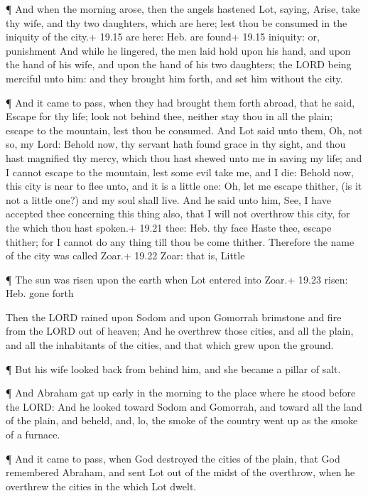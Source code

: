  ¶ And when the morning arose, then the angels hastened
Lot, saying, Arise, take thy wife, and thy two daughters, which are
here; lest thou be consumed in the iniquity of the city.+ 19.15 are
here: Heb. are found+ 19.15 iniquity: or, punishment  And
while he lingered, the men laid hold upon his hand, and upon the hand of
his wife, and upon the hand of his two daughters; the LORD being
merciful unto him: and they brought him forth, and set him without the
city.

 ¶ And it came to pass, when they had brought them forth
abroad, that he said, Escape for thy life; look not behind thee, neither
stay thou in all the plain; escape to the mountain, lest thou be
consumed.  And Lot said unto them, Oh, not so, my Lord:
 Behold now, thy servant hath found grace in thy sight, and
thou hast magnified thy mercy, which thou hast shewed unto me in saving
my life; and I cannot escape to the mountain, lest some evil take me,
and I die:  Behold now, this city is near to flee unto, and
it is a little one: Oh, let me escape thither, (is it not a little one?)
and my soul shall live.  And he said unto him, See, I have
accepted thee concerning this thing also, that I will not overthrow this
city, for the which thou hast spoken.+ 19.21 thee: Heb. thy face
 Haste thee, escape thither; for I cannot do any thing till
thou be come thither. Therefore the name of the city was called Zoar.+
19.22 Zoar: that is, Little

 ¶ The sun was risen upon the earth when Lot entered into
Zoar.+ 19.23 risen: Heb. gone forth

 Then the LORD rained upon Sodom and upon Gomorrah
brimstone and fire from the LORD out of heaven;  And he
overthrew those cities, and all the plain, and all the inhabitants of
the cities, and that which grew upon the ground.

 ¶ But his wife looked back from behind him, and she became
a pillar of salt.

 ¶ And Abraham gat up early in the morning to the place
where he stood before the LORD:  And he looked toward Sodom
and Gomorrah, and toward all the land of the plain, and beheld, and, lo,
the smoke of the country went up as the smoke of a furnace.

 ¶ And it came to pass, when God destroyed the cities of
the plain, that God remembered Abraham, and sent Lot out of the midst of
the overthrow, when he overthrew the cities in the which Lot dwelt.

